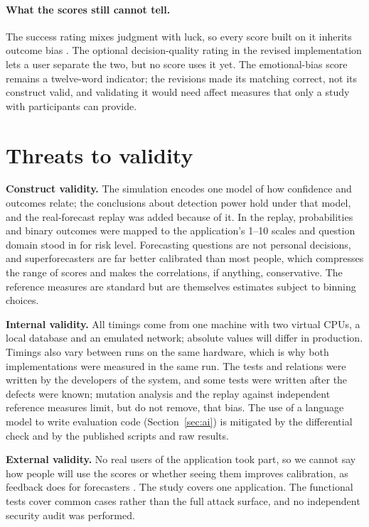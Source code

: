\documentclass[12pt,a4paper]{article}
\begin{document}
\paragraph{What the scores still cannot tell.} The success rating mixes judgment with luck, so every score built on it inherits outcome bias \cite{baron1988}. The optional decision-quality rating in the revised implementation lets a user separate the two, but no score uses it yet. The emotional-bias score remains a twelve-word indicator; the revisions made its matching correct, not its construct valid, and validating it would need affect measures that only a study with participants can provide.

\section{Threats to validity}\label{sec:threats}

\textbf{Construct validity.} The simulation encodes one model of how confidence and outcomes relate; the conclusions about detection power hold under that model, and the real-forecast replay was added because of it. In the replay, probabilities and binary outcomes were mapped to the application's 1--10 scales and question domain stood in for risk level. Forecasting questions are not personal decisions, and superforecasters are far better calibrated than most people, which compresses the range of scores and makes the correlations, if anything, conservative. The reference measures are standard but are themselves estimates subject to binning choices.

\textbf{Internal validity.} All timings come from one machine with two virtual CPUs, a local database and an emulated network; absolute values will differ in production. Timings also vary between runs on the same hardware, which is why both implementations were measured in the same run. The tests and relations were written by the developers of the system, and some tests were written after the defects were known; mutation analysis and the replay against independent reference measures limit, but do not remove, that bias. The use of a language model to write evaluation code (Section~\ref{sec:ai}) is mitigated by the differential check and by the published scripts and raw results.

\textbf{External validity.} No real users of the application took part, so we cannot say how people will use the scores or whether seeing them improves calibration, as feedback does for forecasters \cite{moore2017}. The study covers one application. The functional tests cover common cases rather than the full attack surface, and no independent security audit was performed.
\end{document}
